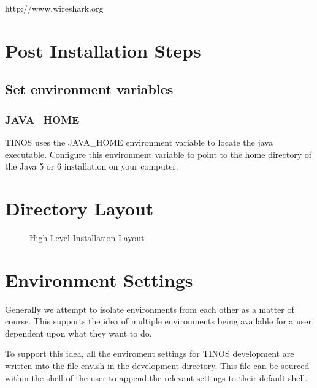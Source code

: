 \begin{center}
http://www.wireshark.org
\end{center}

\section{Post Installation Steps}
\subsection{Set environment variables}
\subsubsection{JAVA\_HOME}
TINOS uses the JAVA\_HOME environment variable to locate the java executable.
Configure this environment variable to point to the home directory of the Java 5 or 6
installation on your computer.


\section{Directory Layout}

\begin{figure}
\caption{High Level Installation Layout}
\end{figure}

\section{Environment Settings}
Generally we attempt to isolate environments from each other as a matter of course.
This supports the idea of multiple environments being available for a user dependent
upon what they want to do.

To support this idea, all the enviroment settings for TINOS development are
written into the file env.sh in the development directory. This file can be sourced within
the shell of the user to append the relevant settings to their default shell.

